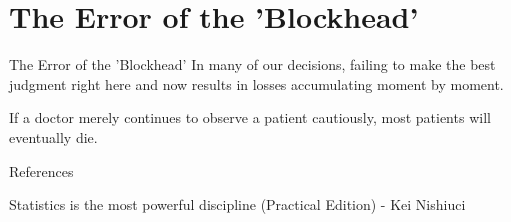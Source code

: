 \documentclass[dvipdfmx, autodetect-engine, aspectratio=169, 10.5pt]{beamer}
\begin{document}
\section{The Error of the 'Blockhead'}

\begin{frame}{The Error of the 'Blockhead'}
	In many of our decisions, failing to make the best judgment right here and now results in losses accumulating moment by moment.

	If a doctor merely continues to observe a patient cautiously, most patients will eventually die.
\end{frame}

\begin{frame}[allowframebreaks]{References}
	\begin{thebibliography}{9}
		Statistics is the most powerful discipline (Practical Edition) - Kei Nishiuci
	\end{thebibliography}
\end{frame}
\end{document}
